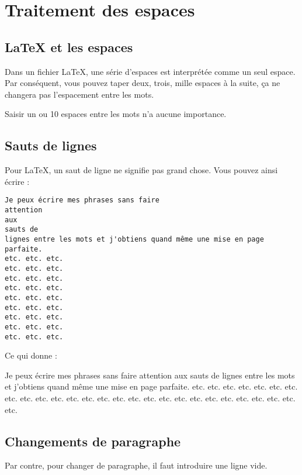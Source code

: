 \section{Traitement des espaces}

\subsection{\LaTeX{} et les espaces}

Dans un fichier \LaTeX{}, une série d'espaces est interprétée comme un
seul espace. Par conséquent, vous pouvez taper deux, trois, mille
espaces à la suite, ça ne changera pas l'espacement entre les mots.
\begin{example}
Saisir un ou           10 
espaces entre les mots n'a 
aucune importance.
\end{example}


\subsection{Sauts de lignes}

Pour \LaTeX, un saut de ligne ne signifie pas grand chose. Vous pouvez
ainsi écrire :

\begin{footnotesize}
\begin{verbatim}
Je peux écrire mes phrases sans faire
attention
aux
sauts de
lignes entre les mots et j'obtiens quand même une mise en page parfaite.
etc. etc. etc.
etc. etc. etc.
etc. etc. etc.
etc. etc. etc.
etc. etc. etc.
etc. etc. etc.
etc. etc. etc.
etc. etc. etc.
etc. etc. etc.
\end{verbatim}
\end{footnotesize}

Ce qui donne :

\begin{boxedminipage}{.5\textwidth}
Je peux écrire mes phrases sans faire
attention
aux
sauts de
lignes entre les mots et j'obtiens quand même une mise en page parfaite.
etc. etc. etc.
etc. etc. etc.
etc. etc. etc.
etc. etc. etc.
etc. etc. etc.
etc. etc. etc.
etc. etc. etc.
etc. etc. etc.
etc. etc. etc.
\end{boxedminipage}


\subsection{Changements de paragraphe}

Par contre, pour changer de paragraphe, il faut introduire une ligne
vide.

